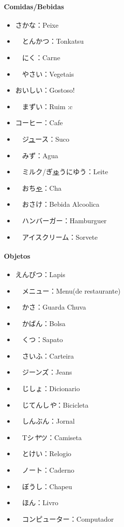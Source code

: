 \documentclass[a4paper, 12pt]{article}
\begin{document}
\begin{CJK}{UTF8}{min}
\paragraph{Comidas/Bebidas}
	\begin{itemize}
		\item さかな：Peixe
		\item　とんかつ：Tonkatsu
		\item　にく：Carne
		\item　やさい：Vegetais
		\item おいしい：Gostoso!
		\item　まずい：Ruim :c
		\item コーヒー：Cafe
		\item　ジ\underline{ュ}ース：Suco
		\item　みず：Agua
		\item　ミルク/ぎ\underline{ゅ}うにゆう：Leite
		\item　おち\underline{ゃ}：Cha
		\item　おさけ：Bebida Alcoolica
		\item　ハンバーガー：Hamburguer
		\item　アイスクリーム：Sorvete
\end{itemize}

\paragraph{Objetos}
	\begin{itemize}
		\item えんぴつ：Lapis
		\item　メニュー：Menu(de restaurante)
		\item　かさ：Guarda Chuva
		\item　かばん：Bolsa
		\item　くつ：Sapato
		\item　さいふ：Carteira
		\item　ジーンズ：Jeans
		\item　じしょ：Dicionario
		\item　じてんし\textit{や}：Bicicleta
		\item　しんぶん：Jornal
		\item　Tシ\textit{ヤ}ツ：Camiseta
		\item　とけい：Relogio
		\item　ノート：Caderno
		\item　ぼうし：Chapeu
		\item　ほん：Livro
		\item　コンピューター：Computador	
		

	\end{itemize}
\end{CJK}
\end{document}
